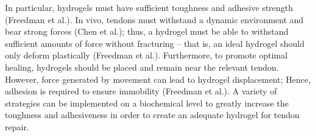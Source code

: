 In particular, hydrogels must have sufficient toughness and adhesive strength (Freedman et al.). In vivo, tendons must withstand a dynamic environment and bear strong forces (Chen et al.); thus, a hydrogel must be able to withstand sufficient amounts of force without fracturing – that is, an ideal hydrogel should only deform plastically (Freedman et al.). Furthermore, to promote optimal healing, hydrogels should be placed and remain near the relevant tendon. However, force generated by movement can lead to hydrogel displacement; Hence, adhesion is required to ensure immobility (Freedman et al.). A variety of strategies can be implemented on a biochemical level to greatly increase the toughness and adhesiveness in order to create an adequate hydrogel for tendon repair.
